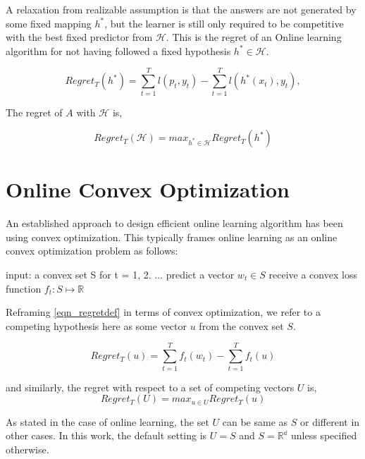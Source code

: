A relaxation from realizable assumption is that the answers are not generated by some fixed mapping $h^*$, but the learner is still only required 
to be competitive with the best fixed predictor from $\mathcal{H}$. This is the regret of an Online learning algorithm for not having followed a 
fixed hypothesis $h^* \in \mathcal{H}$.

\begin{equation}\label{eqn_regretdef}
    Regret_T(h^*) = \sum_{t=1}^T l(p_t, y_t) - \sum_{t=1}^T l(h^*(x_t), y_t),
\end{equation}

The regret of $A$ with $\mathcal{H}$ is,

\begin{equation}\label{eqn_regretdef_all}
    Regret_T(\mathcal{H}) = max_{h^* \in \mathcal{H}} Regret_T(h^*)
\end{equation}


\section{Online Convex Optimization}

An established approach to design efficient online learning algorithm has been using convex optimization. This typically frames online learning as an 
online convex optimization problem as follows:

input: a convex set S
for t = 1, 2. $\ldots$
predict a vector $w_t \in S$
receive a convex loss function $f_t: S \mapsto \mathbb{R}$

Reframing \ref{eqn_regretdef} in terms of convex optimization, we refer to a competing hypothesis here as some vector $u$ from the convex set $S$.

\begin{equation}
    Regret_T(u) = \sum_{t=1}^T f_t(w_t) - \sum_{t=1}^T f_t(u)
\end{equation}

and similarly, the regret with respect to a set of competing vectors $U$ is,
\begin{equation}
    Regret_T(U) = max_{u \in U} Regret_T(u)
\end{equation}

As stated in the case of online learning, the set $U$ can be same as $S$ or different in other cases. In this work, the default setting is $U=S$ and 
$S=\mathbb{R^d}$ unless specified otherwise.


